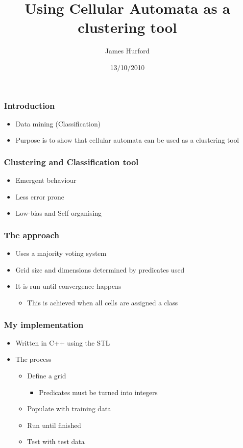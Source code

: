 \documentclass[presentation]{beamer}
\title{Using Cellular Automata as a clustering tool}
\author{James Hurford}
\date{13/10/2010}
\begin{document}
\maketitle




\begin{frame}
\frametitle{Introduction}
\label{sec-1}

\begin{itemize}
\item Data mining (Classification)
\item Purpose is to show that cellular automata can be used as a
   clustering tool
\end{itemize}
\end{frame}
\begin{frame}
\frametitle{Clustering and Classification tool}
\label{sec-2}

\begin{itemize}
\item Emergent behaviour
\item Less error prone
\item Low-bias and Self organising
\end{itemize}
\end{frame}
\begin{frame}
\frametitle{The approach}
\label{sec-3}

\begin{itemize}
\item Uses a majority voting system
\item Grid size and dimensions determined by predicates used
\item It is run until convergence happens

\begin{itemize}
\item This is achieved when all cells are assigned a class
\end{itemize}

\end{itemize}
\end{frame}
\begin{frame}
\frametitle{My implementation}
\label{sec-4}

\begin{itemize}
\item Written in C++ using the STL
\item The process

\begin{itemize}
\item Define a grid

\begin{itemize}
\item Predicates must be turned into integers
\end{itemize}

\item Populate with training data
\item Run until finished
\item Test with test data
\end{itemize}

\end{itemize}
\end{frame}
\end{document}
